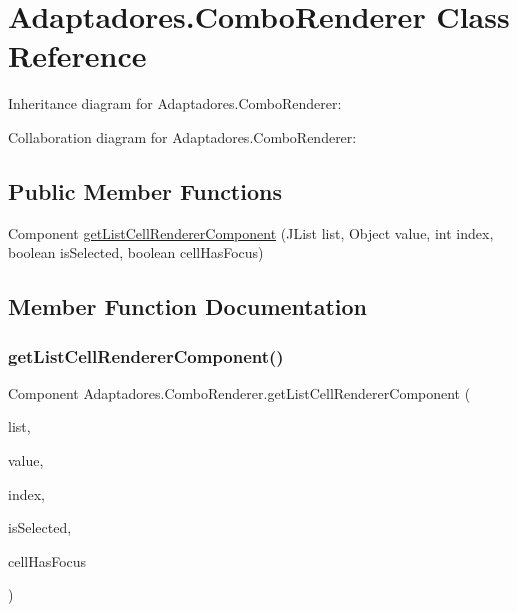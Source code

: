 \hypertarget{class_adaptadores_1_1_combo_renderer}{}\section{Adaptadores.\+Combo\+Renderer Class Reference}
\label{class_adaptadores_1_1_combo_renderer}


Inheritance diagram for Adaptadores.\+Combo\+Renderer\+:


Collaboration diagram for Adaptadores.\+Combo\+Renderer\+:
\subsection*{Public Member Functions}
\begin{DoxyCompactItemize}
\item 
Component \mbox{\hyperlink{class_adaptadores_1_1_combo_renderer_a38d1af7130aec91da8506ba453b14d19}{get\+List\+Cell\+Renderer\+Component}} (J\+List list, Object value, int index, boolean is\+Selected, boolean cell\+Has\+Focus)
\end{DoxyCompactItemize}


\subsection{Member Function Documentation}
\mbox{\label{class_adaptadores_1_1_combo_renderer_a38d1af7130aec91da8506ba453b14d19}} 
\subsubsection{\texorpdfstring{get\+List\+Cell\+Renderer\+Component()}{getListCellRendererComponent()}}
{\footnotesize\ttfamily Component Adaptadores.\+Combo\+Renderer.\+get\+List\+Cell\+Renderer\+Component (\begin{DoxyParamCaption}\item[{J\+List}]{list,  }\item[{Object}]{value,  }\item[{int}]{index,  }\item[{boolean}]{is\+Selected,  }\item[{boolean}]{cell\+Has\+Focus }\end{DoxyParamCaption})\hspace{0.3cm}{\ttfamily [inline]}}

